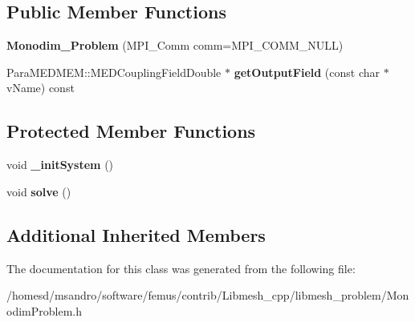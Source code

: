 \subsection*{Public Member Functions}
\begin{DoxyCompactItemize}
\item 
\hypertarget{class_monodim___problem_aa10ea73f10a8522864285623e56bbd9d}{{\bfseries Monodim\-\_\-\-Problem} (M\-P\-I\-\_\-\-Comm comm=M\-P\-I\-\_\-\-C\-O\-M\-M\-\_\-\-N\-U\-L\-L)}\label{class_monodim___problem_aa10ea73f10a8522864285623e56bbd9d}

\item 
\hypertarget{class_monodim___problem_aa2010ed59798e7bf539fb26a5197f2cb}{Para\-M\-E\-D\-M\-E\-M\-::\-M\-E\-D\-Coupling\-Field\-Double $\ast$ {\bfseries get\-Output\-Field} (const char $\ast$v\-Name) const }\label{class_monodim___problem_aa2010ed59798e7bf539fb26a5197f2cb}

\end{DoxyCompactItemize}
\subsection*{Protected Member Functions}
\begin{DoxyCompactItemize}
\item 
\hypertarget{class_monodim___problem_a1a46815fc044d21fd69eeeeafde045df}{void {\bfseries \-\_\-init\-System} ()}\label{class_monodim___problem_a1a46815fc044d21fd69eeeeafde045df}

\item 
\hypertarget{class_monodim___problem_a90b1fcc9ab7e572b493ad239b2c6983d}{void {\bfseries solve} ()}\label{class_monodim___problem_a90b1fcc9ab7e572b493ad239b2c6983d}

\end{DoxyCompactItemize}
\subsection*{Additional Inherited Members}


The documentation for this class was generated from the following file\-:\begin{DoxyCompactItemize}
\item 
/homesd/msandro/software/femus/contrib/\-Libmesh\-\_\-cpp/libmesh\-\_\-problem/Monodim\-Problem.\-h\end{DoxyCompactItemize}
